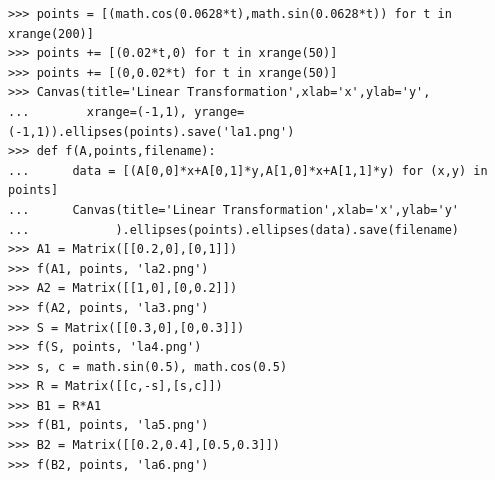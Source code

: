 \documentclass[justified,sixbynine]{tufte-book}
\def\ft{\small\tt}
\theoremstyle{plain}%
\theoremstyle{definition}
\theoremstyle{remark}
\begin{document}
\begin{fullwidth}
\begin{lstlisting}[caption={in file: {\ft nlib.py}}]
>>> points = [(math.cos(0.0628*t),math.sin(0.0628*t)) for t in xrange(200)]
>>> points += [(0.02*t,0) for t in xrange(50)]
>>> points += [(0,0.02*t) for t in xrange(50)]
>>> Canvas(title='Linear Transformation',xlab='x',ylab='y',
...        xrange=(-1,1), yrange=(-1,1)).ellipses(points).save('la1.png')
>>> def f(A,points,filename):
...      data = [(A[0,0]*x+A[0,1]*y,A[1,0]*x+A[1,1]*y) for (x,y) in points]
...      Canvas(title='Linear Transformation',xlab='x',ylab='y'
...            ).ellipses(points).ellipses(data).save(filename)
>>> A1 = Matrix([[0.2,0],[0,1]])
>>> f(A1, points, 'la2.png')
>>> A2 = Matrix([[1,0],[0,0.2]])
>>> f(A2, points, 'la3.png')
>>> S = Matrix([[0.3,0],[0,0.3]])
>>> f(S, points, 'la4.png')
>>> s, c = math.sin(0.5), math.cos(0.5)
>>> R = Matrix([[c,-s],[s,c]])
>>> B1 = R*A1
>>> f(B1, points, 'la5.png')
>>> B2 = Matrix([[0.2,0.4],[0.5,0.3]])
>>> f(B2, points, 'la6.png')
\end{lstlisting}

\newpage


\end{fullwidth}
\end{document}

